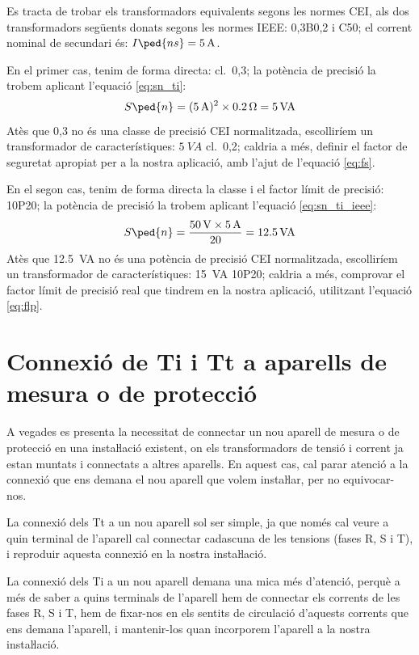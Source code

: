 \begin{exemple}[\TrafoIeeeEqCei{}]
	\addcontentsxms{\TrafoIeeeEqCei}
    Es tracta de trobar els transformadors equivalents segons les normes CEI, als dos
    transformadors següents donats segons les normes IEEE: 0,3B0,2 i
    C50; el corrent nominal de secundari és:    $I\ped{ns}=\qty{5}{A}$.

    En el primer cas, tenim de forma directa: cl.~0,3; la potència de precisió la trobem
    aplicant l'equació \eqref{eq:sn_ti}:
    \[
        S\ped{n} =(\qty{5}{A})^2 \times \qty{0,2}{\ohm} =  \qty{5}{VA}
    \]
    Atès que 0,3 no és una classe de precisió CEI normalitzada,
    escolliríem un transformador de característiques: $\qty{5}{VA}$ cl.~0,2; caldria a més, definir el factor de
    seguretat apropiat per a la nostra aplicació, amb l'ajut de l'equació \eqref{eq:fs}.

    En el segon cas, tenim de forma directa la classe i el factor límit de
    precisió: 10P20; la potència de precisió la trobem
    aplicant l'equació \eqref{eq:sn_ti_ieee}:
    \[
        S\ped{n} = \frac{\qty{50}{V} \times\qty{5}{A}}{20} = \qty{12,5}{VA}
    \]
    Atès que \SI{12,5}{VA} no és una potència de precisió CEI normalitzada,
     escolliríem un transformador de característiques:
    \SI{15}{VA} 10P20; caldria a més, comprovar el factor límit de precisió real
    que tindrem en la nostra aplicació, utilitzant l'equació \eqref{eq:flp}.
\end{exemple}

\section{Connexió de Ti i Tt a aparells de mesura o de
protecció}\label{sec:conex_ti_tt}

A vegades es presenta la necessitat de connectar un nou aparell de
mesura o de protecció en una instaŀlació existent, on els
transformadors de tensió i corrent ja estan muntats i connectats a
altres aparells. En aquest cas, cal parar atenció a la connexió
que ens demana el nou aparell que volem instaŀlar, per  no
equivocar-nos.

La connexió dels Tt a un nou aparell sol ser simple, ja que només
cal veure a quin terminal de l'aparell cal connectar cadascuna de
les tensions (fases R, S i T), i reproduir aquesta connexió en la
nostra instaŀlació.

La connexió dels Ti a un nou aparell demana una mica més
d'atenció, perquè a més de saber a  quins terminals de l'aparell hem
de connectar els corrents de les fases R, S i T, hem de fixar-nos
en els sentits de circulació d'aquests corrents que ens demana
l'aparell, i mantenir-los quan incorporem l'aparell a la nostra
instaŀlació.

